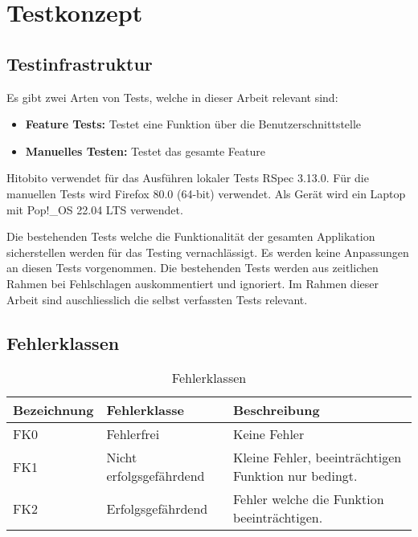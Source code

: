\newpage

\section{Testkonzept}
\subsection{Testinfrastruktur}
Es gibt zwei Arten von Tests, welche in dieser Arbeit relevant sind:

\begin{itemize}
   \item \textbf{Feature Tests:} Testet eine Funktion über die Benutzerschnittstelle
   \item \textbf{Manuelles Testen:} Testet das gesamte Feature
\end{itemize}

Hitobito verwendet für das Ausführen lokaler Tests RSpec 3.13.0. Für die manuellen Tests wird Firefox 80.0 (64-bit) verwendet. Als Gerät wird ein Laptop mit Pop!\_OS 22.04 LTS verwendet.

Die bestehenden Tests welche die Funktionalität der gesamten Applikation sicherstellen werden für das Testing vernachlässigt. Es werden keine Anpassungen
an diesen Tests vorgenommen. Die bestehenden Tests werden aus zeitlichen Rahmen bei Fehlschlagen auskommentiert und ignoriert. Im Rahmen dieser Arbeit sind
auschliesslich die selbst verfassten Tests relevant.

\subsection{Fehlerklassen}
\begin{table}[h!]
   \begin{tabular}{|L{0.2\textwidth}|L{0.4\textwidth}|L{0.4\textwidth}|}
       \hline
        \color{white}\textbf{Bezeichnung} & \color{white}\textbf{Fehlerklasse} & \color{white}\textbf{Beschreibung} \\[12pt]
       \hline
       FK0 & Fehlerfrei & Keine Fehler \\
       \hline
       FK1 & Nicht erfolgsgefährdend & Kleine Fehler, beeinträchtigen Funktion nur bedingt. \\
       \hline
       FK2 & Erfolgsgefährdend & Fehler welche die Funktion beeinträchtigen. \\
       \hline
     \end{tabular}
     \caption{Fehlerklassen}
\end{table}

